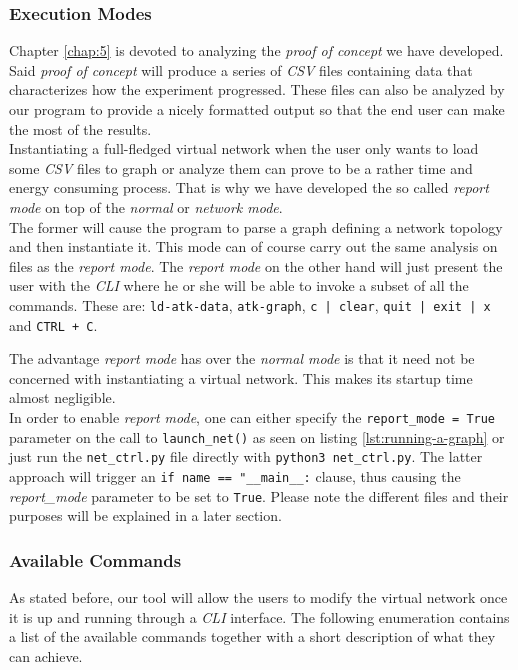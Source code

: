             \subsubsection{Execution Modes}
                Chapter \ref{chap:5} is devoted to analyzing the \textit{proof of concept} we have developed. Said \textit{proof of concept} will produce a series of \textit{CSV} files containing data that characterizes how the experiment progressed. These files can also be analyzed by our program to provide a nicely formatted output so that the end user can make the most of the results.\\

                Instantiating a full-fledged virtual network when the user only wants to load some \textit{CSV} files to graph or analyze them can prove to be a rather time and energy consuming process. That is why we have developed the so called \textit{report mode} on top of the \textit{normal} or \textit{network mode}.\\

                The former will cause the program to parse a graph defining a network topology and then instantiate it. This mode can of course carry out the same analysis on files as the \textit{report mode}. The \textit{report mode} on the other hand will just present the user with the \textit{CLI} where he or she will be able to invoke a subset of all the commands. These are: \texttt{ld-atk-data}, \texttt{atk-graph}, \texttt{c | clear}, \texttt{quit | exit | x} and \texttt{CTRL + C}.

                The advantage \textit{report mode} has over the \textit{normal mode} is that it need not be concerned with instantiating a virtual network. This makes its startup time almost negligible.\\

                In order to enable \textit{report mode}, one can either specify the \texttt{report\_mode = True} parameter on the call to \texttt{launch\_net()} as seen on listing \ref{lst:running-a-graph} or just run the \texttt{net\_ctrl.py} file directly with \texttt{python3 net\_ctrl.py}. The latter approach will trigger an \texttt{if name == "\_\_main\_\_:} clause, thus causing the \textit{report\_mode} parameter to be set to \texttt{True}. Please note the different files and their purposes will be explained in a later section.\\

            \subsubsection{Available Commands} \label{sec:cli-cmds}
                As stated before, our tool will allow the users to modify the virtual network once it is up and running through a \textit{CLI} interface. The following enumeration contains a list of the available commands together with a short description of what they can achieve.\\

